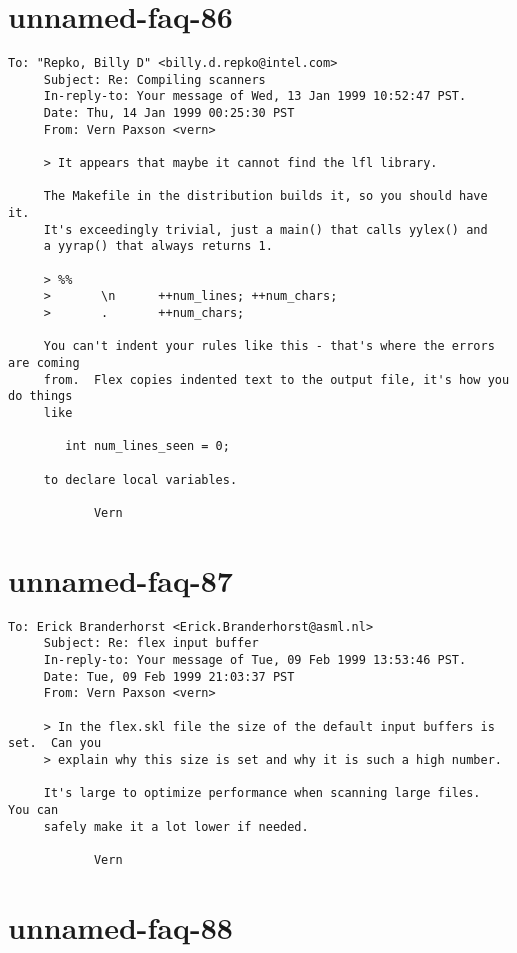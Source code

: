 \documentclass[openany,oneside]{book}
\begin{document}
\section{unnamed-faq-86}

\begin{verbatim}
To: "Repko, Billy D" <billy.d.repko@intel.com>
     Subject: Re: Compiling scanners
     In-reply-to: Your message of Wed, 13 Jan 1999 10:52:47 PST.
     Date: Thu, 14 Jan 1999 00:25:30 PST
     From: Vern Paxson <vern>
     
     > It appears that maybe it cannot find the lfl library.
     
     The Makefile in the distribution builds it, so you should have it.
     It's exceedingly trivial, just a main() that calls yylex() and
     a yyrap() that always returns 1.
     
     > %%
     >       \n      ++num_lines; ++num_chars;
     >       .       ++num_chars;
     
     You can't indent your rules like this - that's where the errors are coming
     from.  Flex copies indented text to the output file, it's how you do things
     like
     
     	int num_lines_seen = 0;
     
     to declare local variables.
     
     		Vern
\end{verbatim}

\section{unnamed-faq-87}

\begin{verbatim}
To: Erick Branderhorst <Erick.Branderhorst@asml.nl>
     Subject: Re: flex input buffer
     In-reply-to: Your message of Tue, 09 Feb 1999 13:53:46 PST.
     Date: Tue, 09 Feb 1999 21:03:37 PST
     From: Vern Paxson <vern>
     
     > In the flex.skl file the size of the default input buffers is set.  Can you
     > explain why this size is set and why it is such a high number.
     
     It's large to optimize performance when scanning large files.  You can
     safely make it a lot lower if needed.
     
     		Vern
\end{verbatim}

\section{unnamed-faq-88}
\end{document}

